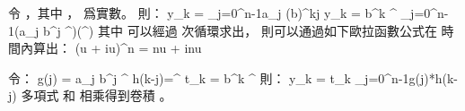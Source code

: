 \startANSWER
令 ，其中 ，  爲實數。
則：
\startformula
y_k = \sum_{j=0}^{n-1}a_j (b\omega)^{kj}
\stopformula
\startformula
y_k = b^{k} \omega^{}
	\sum_{j=0}^{n-1}(a_j b^j \omega^{})(\omega^{})
\stopformula
其中  可以經過  次循環求出，
  則可以通過如下歐拉函數公式在  時間內算出：
\startformula
(\cos u + i\sin u)^n = \cos nu + i\sin nu
\stopformula

令：
\startformula
g(j) = a_j b^j \omega^{}
\stopformula
\startformula
h(k-j)=\omega^{}
\stopformula
\startformula
t_k = b^k \omega^{}
\stopformula
則：
\startformula
y_k = t_k \sum_{j=0}^{n-1}g(j)*h(k-j)
\stopformula
多項式  和  相乘得到卷積 。
\stopANSWER
\stopsection
